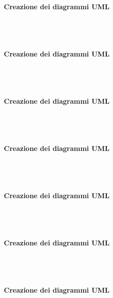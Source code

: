 \paragraph{Creazione dei diagrammi UML} \mbox{}\\ \mbox{}\\

\paragraph{Creazione dei diagrammi UML} \mbox{}\\ \mbox{}\\

\paragraph{Creazione dei diagrammi UML} \mbox{}\\ \mbox{}\\

\paragraph{Creazione dei diagrammi UML} \mbox{}\\ \mbox{}\\

\paragraph{Creazione dei diagrammi UML} \mbox{}\\ \mbox{}\\

\paragraph{Creazione dei diagrammi UML} \mbox{}\\ \mbox{}\\

\paragraph{Creazione dei diagrammi UML} \mbox{}\\ \mbox{}\\

